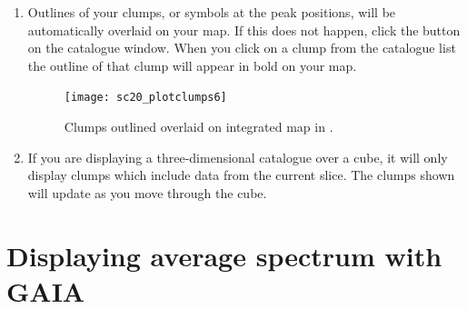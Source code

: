 \documentclass[11pt,oneside,chapters]{starlink}
\begin{document}
\begin{enumerate}[label=(\textbf{\arabic*})]
\item Outlines of your clumps, or symbols at the peak positions, will
be automatically overlaid on your map. If this does not happen, click
the  button on the catalogue window. When you click on
a clump from the catalogue list the outline of that clump will appear
in bold on your map.

\begin{figure}[h!]
\begin{center}
\texttt{[image: sc20\_plotclumps6]}
\caption[Clumps outlined overlaid on integrated map in \gaia.]{\label{fig:gaia_clumps4}
  Clumps outlined overlaid on integrated map in \gaia.}
\end{center}
\end{figure}

\item If you are displaying a three-dimensional catalogue over a cube,
it will only display clumps which include data from the current slice.
The clumps shown will update as you move through the cube.

\end{enumerate}

\section{Displaying average spectrum with GAIA}
\label{sec:gaiaaverage}
\end{document}
